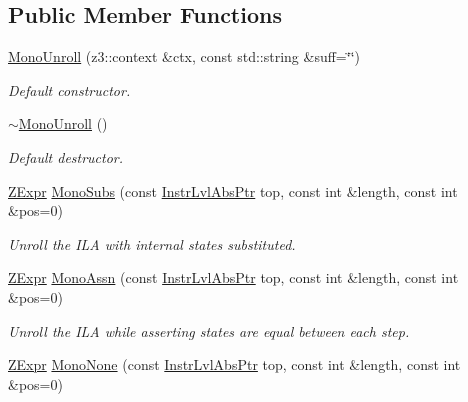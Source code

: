 \subsection*{Public Member Functions}
\begin{DoxyCompactItemize}
\item 
\mbox{\label{classilang_1_1_mono_unroll_aeca1517897661177d3452a63447ff2e8}} 
\mbox{\hyperlink{classilang_1_1_mono_unroll_aeca1517897661177d3452a63447ff2e8}{Mono\+Unroll}} (z3\+::context \&ctx, const std\+::string \&suff=\char`\"{}\char`\"{})
\begin{DoxyCompactList}\small\item\em Default constructor. \end{DoxyCompactList}\item 
\mbox{\label{classilang_1_1_mono_unroll_a44b49f108a2fe3a6f712975df8e1f03a}} 
\mbox{\hyperlink{classilang_1_1_mono_unroll_a44b49f108a2fe3a6f712975df8e1f03a}{$\sim$\+Mono\+Unroll}} ()
\begin{DoxyCompactList}\small\item\em Default destructor. \end{DoxyCompactList}\item 
\mbox{\hyperlink{classilang_1_1_unroller_a9fd0359e3ffd666f8f92ad3c3ef52673}{Z\+Expr}} \mbox{\hyperlink{classilang_1_1_mono_unroll_aa808ab172856281103f20fefe27085b8}{Mono\+Subs}} (const \mbox{\hyperlink{namespaceilang_ad1b30fdf347e493b3937143da05d1a72}{Instr\+Lvl\+Abs\+Ptr}} top, const int \&length, const int \&pos=0)
\begin{DoxyCompactList}\small\item\em Unroll the I\+LA with internal states substituted. \end{DoxyCompactList}\item 
\mbox{\hyperlink{classilang_1_1_unroller_a9fd0359e3ffd666f8f92ad3c3ef52673}{Z\+Expr}} \mbox{\hyperlink{classilang_1_1_mono_unroll_ab880d6b2993eeeb4a2fdbd89f3089838}{Mono\+Assn}} (const \mbox{\hyperlink{namespaceilang_ad1b30fdf347e493b3937143da05d1a72}{Instr\+Lvl\+Abs\+Ptr}} top, const int \&length, const int \&pos=0)
\begin{DoxyCompactList}\small\item\em Unroll the I\+LA while asserting states are equal between each step. \end{DoxyCompactList}\item 
\mbox{\hyperlink{classilang_1_1_unroller_a9fd0359e3ffd666f8f92ad3c3ef52673}{Z\+Expr}} \mbox{\hyperlink{classilang_1_1_mono_unroll_a4c0358f80f40c17be6db6074bd814de6}{Mono\+None}} (const \mbox{\hyperlink{namespaceilang_ad1b30fdf347e493b3937143da05d1a72}{Instr\+Lvl\+Abs\+Ptr}} top, const int \&length, const int \&pos=0)

\end{DoxyCompactItemize}
